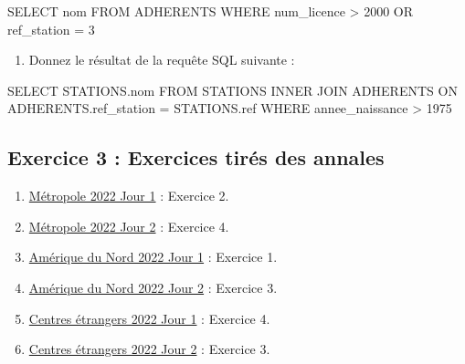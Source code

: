 \documentclass[
  a4paper,
  DIV=11,
  numbers=noendperiod]{scrartcl}
\newenvironment{Shaded}{\begin{snugshade}}{\end{snugshade}}
\newcommand{\DecValTok}[1]{\textcolor[rgb]{0.68,0.00,0.00}{#1}}
\newcommand{\FunctionTok}[1]{\textcolor[rgb]{0.28,0.35,0.67}{#1}}
\newcommand{\KeywordTok}[1]{\textcolor[rgb]{0.00,0.23,0.31}{#1}}
\newcommand{\NormalTok}[1]{\textcolor[rgb]{0.00,0.23,0.31}{#1}}
\newcommand{\OperatorTok}[1]{\textcolor[rgb]{0.37,0.37,0.37}{#1}}
\providecommand{\tightlist}{%
  \setlength{\itemsep}{0pt}\setlength{\parskip}{0pt}}\usepackage{longtable,booktabs,array}
\begin{document}
\begin{Shaded}
\begin{Highlighting}[]
\KeywordTok{SELECT}\NormalTok{ nom }
\KeywordTok{FROM}\NormalTok{ ADHERENTS }
\KeywordTok{WHERE}\NormalTok{ num\_licence }\OperatorTok{\textgreater{}} \DecValTok{2000} \KeywordTok{OR}\NormalTok{  ref\_station }\OperatorTok{=} \DecValTok{3}
\end{Highlighting}
\end{Shaded}

\begin{enumerate}
\def\labelenumi{\arabic{enumi}.}
\setcounter{enumi}{4}
\tightlist
\item
  Donnez le résultat de la requête SQL suivante :
\end{enumerate}

\begin{Shaded}
\begin{Highlighting}[]
\KeywordTok{SELECT}\NormalTok{ STATIONS.nom}
\KeywordTok{FROM}\NormalTok{ STATIONS}
\KeywordTok{INNER} \KeywordTok{JOIN}\NormalTok{ ADHERENTS }\KeywordTok{ON}\NormalTok{ ADHERENTS.ref\_station }\OperatorTok{=}\NormalTok{ STATIONS.}\FunctionTok{ref}
\KeywordTok{WHERE}\NormalTok{ annee\_naissance }\OperatorTok{\textgreater{}} \DecValTok{1975}
\end{Highlighting}
\end{Shaded}

\hypertarget{fa-solid-pencil-alt-exercice-3-exercices-tiruxe9s-des-annales}{%
\subsection{\texorpdfstring{ Exercice 3 : Exercices
tirés des
annales}{ Exercice 3 : Exercices tirés des annales}}\label{fa-solid-pencil-alt-exercice-3-exercices-tiruxe9s-des-annales}}

\begin{enumerate}
\def\labelenumi{\arabic{enumi}.}
\tightlist
\item
  \href{../annales/2022_Metropole_Jour1.pdf}{Métropole 2022 Jour 1} :
  Exercice 2.
\item
  \href{../annales/2022_Metropole_Jour2.pdf}{Métropole 2022 Jour 2} :
  Exercice 4.
\item
  \href{../annales/2022_AmeriqueDuNord_1.pdf}{Amérique du Nord 2022 Jour
  1} : Exercice 1.
\item
  \href{../annales/2022_AmeriqueDuNord_2.pdf}{Amérique du Nord 2022 Jour
  2} : Exercice 3.
\item
  \href{../annales/2022_CentresEtrangers_1.pdf}{Centres étrangers 2022
  Jour 1} : Exercice 4.
\item
  \href{../annales/2022_CentresEtrangers_2.pdf}{Centres étrangers 2022
  Jour 2} : Exercice 3.
\end{enumerate}
\end{document}
